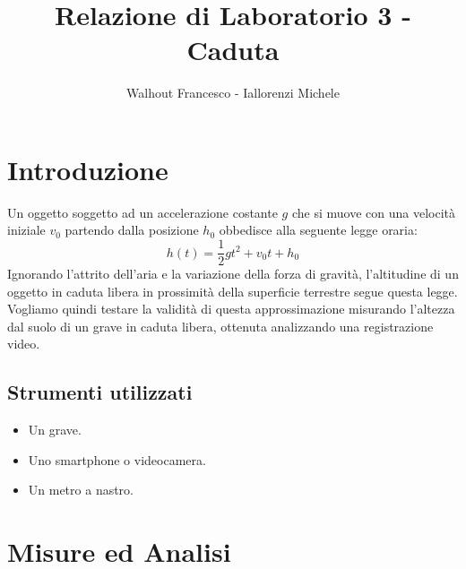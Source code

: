 \documentclass[a4paper]{article}
\title{Relazione di Laboratorio 3 - Caduta}
\author{Walhout Francesco - Iallorenzi Michele}
\begin{document}
    \maketitle

    \section{Introduzione}
    Un oggetto soggetto ad un accelerazione costante $g$ che si muove con una velocità
    iniziale $v_0$ partendo dalla posizione $h_0$ obbedisce alla seguente legge oraria:
    \begin{equation}
        h(t)= \frac{1}{2}gt^2+v_0t+h_0 \label{eq:legge_oraria}
    \end{equation}
    Ignorando l'attrito dell'aria e la variazione della forza di gravità, l'altitudine di
    un oggetto in caduta libera in prossimità della superficie terrestre segue questa legge.
    Vogliamo quindi testare la validità di questa approssimazione misurando l'altezza dal
    suolo di un grave in caduta libera, ottenuta analizzando una registrazione video.
    \subsection{Strumenti utilizzati}
    \begin{itemize}
        \item Un grave.
        \item Uno smartphone o videocamera.
        \item Un metro a nastro.
    \end{itemize}

    \section{Misure ed Analisi}
\end{document}
